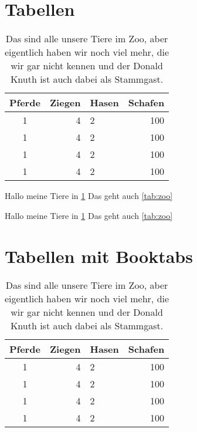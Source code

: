 \section{Tabellen}

\begin{table}[t!] 
    \begin{center}
        \begin{tabular}{|c|r|l|r|}\hline
            Pferde & Ziegen & Hasen & Schafen \\\hline\hline
            1 & 4 & 2 & 100 \\
            1 & 4 & 2 & 100 \\\hline
            1 & 4 & 2 & 100 \\\hline
            1 & 4 & 2 & 100 \\\hline
        \end{tabular}
    \caption[Tiere im Zoo. So.]{Das sind alle unsere Tiere im Zoo, aber eigentlich haben wir noch viel mehr, die wir gar nicht kennen und der Donald Knuth ist auch dabei als Stammgast.}
    \label{tab:zoo}
    \end{center}
\end{table}


Hallo meine Tiere in \ref{tab:zoo}
Das geht auch \vref{tab:zoo}


Hallo meine Tiere in \ref{tab:zoo}
Das geht auch \vref{tab:zoo}


\section{Tabellen mit Booktabs}

\begin{table}[] 
    \begin{center}
        \begin{tabular}{c|r|l|r}\toprule
            Pferde & Ziegen & Hasen & Schafen \\\midrule
            1 & 4 & 2 & 100 \\
            1 & 4 & 2 & 100 \\
            1 & 4 & 2 & 100 \\
            1 & 4 & 2 & 100 \\\bottomrule
        \end{tabular}
        \caption[Tiere im Zoo. So.]{Das sind alle unsere Tiere im Zoo, aber eigentlich haben wir noch viel mehr, die wir gar nicht kennen und der Donald Knuth ist auch dabei als Stammgast.}
        \label{tab:booktabszoo}
    \end{center}
\end{table}

\clearpage
\listoftables